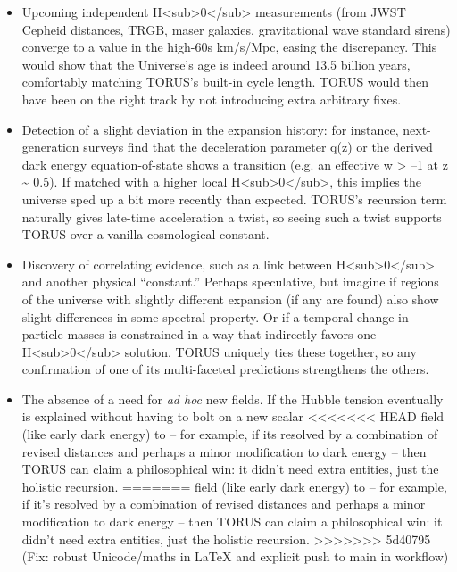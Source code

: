 \documentclass[]{article}
\begin{document}
\begin{itemize}
\item
  Upcoming independent
  H\textless{}sub\textgreater{}0\textless{}/sub\textgreater{}
  measurements (from JWST Cepheid distances, TRGB, maser galaxies,
  gravitational wave standard sirens) converge to a value in the
  high-60s km/s/Mpc, easing the discrepancy. This would show that the
  Universe's age is indeed around 13.5 billion years, comfortably
  matching TORUS's built-in cycle length. TORUS would then have been on
  the right track by not introducing extra arbitrary fixes.
\item
  Detection of a slight deviation in the expansion history: for
  instance, next-generation surveys find that the deceleration parameter
  q(z) or the derived dark energy equation-of-state shows a transition
  (e.g. an effective w \textgreater{} --1 at z \textasciitilde{} 0.5).
  If matched with a higher local
  H\textless{}sub\textgreater{}0\textless{}/sub\textgreater{}, this
  implies the universe sped up a bit more recently than expected.
  TORUS's recursion term naturally gives late-time acceleration a twist,
  so seeing such a twist supports TORUS over a vanilla cosmological
  constant.
\item
  Discovery of correlating evidence, such as a link between
  H\textless{}sub\textgreater{}0\textless{}/sub\textgreater{} and
  another physical ``constant.'' Perhaps speculative, but imagine if
  regions of the universe with slightly different expansion (if any are
  found) also show slight differences in some spectral property. Or if a
  temporal change in particle masses is constrained in a way that
  indirectly favors one
  H\textless{}sub\textgreater{}0\textless{}/sub\textgreater{} solution.
  TORUS uniquely ties these together, so any confirmation of one of its
  multi-faceted predictions strengthens the others.
\item
  The absence of a need for \emph{ad hoc} new fields. If the Hubble
  tension eventually is explained without having to bolt on a new scalar
<<<<<<< HEAD
  field (like early dark energy) to \LambdaCDM -- for example, if
  it\textquotesingle s resolved by a combination of revised distances
  and perhaps a minor modification to dark energy -- then TORUS can
  claim a philosophical win: it didn't need extra entities, just the
  holistic recursion.
=======
  field (like early dark energy) to \LambdaCDM -- for example, if it's
  resolved by a combination of revised distances and perhaps a minor
  modification to dark energy -- then TORUS can claim a philosophical
  win: it didn't need extra entities, just the holistic recursion.
>>>>>>> 5d40795 (Fix: robust Unicode/maths in LaTeX and explicit push to main in workflow)
\end{itemize}
\end{document}
